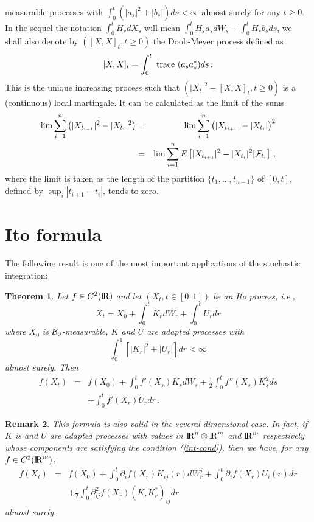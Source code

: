 \documentclass[12pt,a4paper]{book}
\newtheorem{theorem}{Theorem}[section]
\newtheorem{remarkk}[theorem]{Remark}
\newcommand{\be}{\begin{equation}}
\newcommand{\ee}{\end{equation}}
\newcommand{\beaa}{\begin{eqnarray*}}
\newcommand{\eeaa}{\end{eqnarray*}}
\newcommand{\calB}{{\cal B}}
\newcommand{\calF}{{\cal F}}
\newcommand{\R}{{\rm I\!R}}
\newcommand{\trace}{{\,\,\rm trace\,\,}}
\begin{document}
measurable processes with $\int_0^t(|a_s|^2+|b_s|)ds<\infty$ almost
surely for any $t\geq 0$. In the sequel the notation 
$\int_0^tH_sdX_s$ will mean $\int_0^tH_sa_sdW_s+\int_0^tH_sb_sds$, we
shall also denote by $([X,X]_t,t\geq 0)$ the Doob-Meyer process
defined as 
$$
[X,X]_t=\int_0^t\trace(a_sa^*_s)ds\,.
$$
This is the unique increasing process such that
$(|X_t|^2-[X,X]_t,t\geq 0)$ is a (continuous) local martingale. It can
be calculated as the limit of the sums 
\begin{eqnarray*}
\lim\sum_{i=1}^n\left(|X_{t_{i+1}}|^2-|X_{t_i}|^2\right)&=&
\lim\sum_{i=1}^n\left(|X_{t_{i+1}}|-|X_{t_i}|\right)^2\\
&=&\lim\sum_{i=1}^nE\left[|X_{t_{i+1}}|^2-|X_{t_i}|^2|\calF_{t_i}\right]\,,
\end{eqnarray*}
where the limit is taken as the length of the partition
$\{t_1,\ldots,t_{n+1}\}$ of $[0,t]$, defined by $\sup_i|t_{i+1}-t_i|$,
tends to zero.
\section{Ito formula}
The  following result is one of the most  important  applications of
the stochastic integration:
\begin{theorem}
Let  $f\in C^2(\R)$ and let $(X_t,t\in [0,1])$ be an Ito process,
i.e.,
$$
X_t=X_0+\int_0^t K_r dW_r+\int_0^t U_rdr
$$
where $X_0$ is $\calB_0$-measurable,  $K$ and $U$ are adapted processes with
\be
\label{int-cond}
\int_0^1\left[|K_r|^2+|U_r|\right]dr<\infty
\ee
almost surely.
Then
\beaa
f(X_t)&=&f(X_0)+\int_0^t f'(X_s)K_s dW_s+\frac{1}{2} \int_0^t
f''(X_s)K_s^2ds\\
&&+\int_0^tf'(X_r)U_rdr\,.
\eeaa
\end{theorem}
\begin{remarkk}{\rm
This formula is also valid in the several dimensional case.  In fact,
if $K$ is and
$U$ are adapted processes with values in $\R^n\otimes \R^m$ and $\R^m$
respectively whose components are satisfying the condition
(\ref{int-cond}), then we have, for any $f\in C^2(\R^m)$,
\beaa
f(X_t)&=&f(X_0)+\int_0^t\partial_i f(X_r)K_{ij}(r)dW^j_r
+\int_0^t\partial_i f(X_r)U_i(r)dr\\
&&+\frac{1}{2}\int_0^t\partial^2_{ij}f(X_r)(K_rK_r^*)_{ij}dr
\eeaa
almost surely.}
\end{remarkk}
\end{document}
